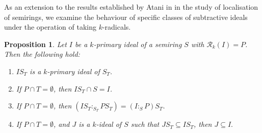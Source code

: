 \documentclass[11pt,leqno]{amsart}
\newtheorem{proposition}[theorem]{Proposition}
\theoremstyle{definition}
\numberwithin{equation}{section}
\begin{document}
As an extension to the results established by Atani in \cite[Lemma 9]{Atani08} in the study of localisation of semirings, we examine the behaviour of specific classes of subtractive ideals under the operation of taking $k$-radicals. 

\begin{proposition}\label{loc6}
Let $I$ be a $k$-primary ideal of a semiring $S$ with $\mathcal{R}_k(I) = P$. Then the following hold:
\begin{enumerate}
	
\item $IS_T$ is a $k$-primary ideal of $S_T$.

\item If $P \cap T = \emptyset$, then $IS_T \cap S = I$.

\item  If $P \cap T = \emptyset$, then $(IS_T :_{S_T} PS_T)=(I :_S P)S_T$.

\item If $P \cap T = \emptyset$, and $J$ is a $k$-ideal of $S$ such that $JS_T\subseteq IS_T$, then $J \subseteq  I.$
\end{enumerate}
\end{proposition}
\end{document}
